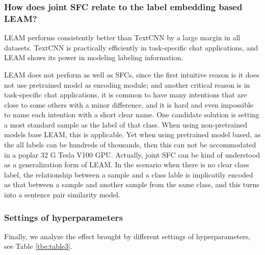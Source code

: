 \documentclass[letterpaper]{article} %
\begin{document}
  \subsubsection*{How does joint SFC relate to the label  embedding based  LEAM?}
  LEAM performs consistently better than TextCNN by a large margin in all
  datasets. TextCNN is practically efficiently in task-specific chat
  applications, and LEAM shows its power in modeling labeling information.

  LEAM  does not perform as well as SFCs, since the first intuitive reason is it
  does  not use pretrained model as encoding module; and another critical reason
  is  in  task-specific  chat applications, it is common to have many intentions
  that are close to some others with a minor difference, and it is hard and even
  impossible  to  name  each  intention  with  a short clear name. One candidate
  solution  is  setting  a most standard sample as the label of that class. When
  using  non-pretrained  models  base  LEAM,  this is applicable. Yet when using
  pretrained  model  based, as the all labels can be hundreds of thousands, then
  this  can not be accommodated in a poplar 32 G Tesla V100 GPU. Actually, joint
  SFC  can  be  kind  of  understood  as  a  generalization form of LEAM. In the
  scenario when there is no clear class label, the relationship between a sample
  and  a class lable is implicatily encoded as that between a sample and another
  sample  from  the  same  class, and this turns into a sentence pair similarity
  model.

  \subsubsection*{Settings  of  hyperparameters} 
  Finally, we analyze the effect brought
  by  different  settings  of  hyperparameters,  see  Table \ref{tbe:table3}. 
\end{document}
